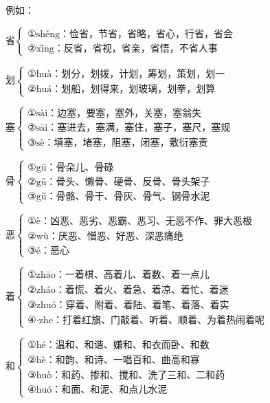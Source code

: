 例如：
\begin{flushleft}
$
\text{省}
\begin{cases}
	\text{①shěng：俭省，节省，省略，省心，行省，省会}\\
	\text{②xǐng：反省，省视，省亲，省悟，不省人事}
\end{cases}
$

\vspace{1em}

$
\text{划}
\begin{cases}
	\text{①huà：划分，划拨，计划，筹划，策划，划一}\\
	\text{②huá：划船，划得来，划玻璃，划拳，划算}
\end{cases}
$

\vspace{1em}

$
\text{塞}
\begin{cases}
	\text{①sài：边塞，要塞，塞外，关塞，塞翁失}\\
	\text{②sāi：塞进去，塞满，塞住，塞子，塞尺，塞规}\\
	\text{③sè：填塞，堵塞，阻塞，闭塞，敷衍塞责}
\end{cases}
$
\end{flushleft}

\begin{flushleft}
$
\text{骨}
\begin{cases}
	\text{①gū：骨朵儿、骨碌}\\
	\text{②gǔ：骨头、懒骨、硬骨、反骨、骨头架子}\\
	\text{③gǔ：骨骼、骨干、骨灰、骨气、钢骨水泥}
\end{cases}
$

\vspace{1em}

$
\text{恶}
\begin{cases}
	\text{①è：凶恶、恶劣、恶霸、恶习、无恶不作、罪大恶极}\\
	\text{②wù：厌恶、憎恶、好恶、深恶痛绝}\\
	\text{③ě：恶心}
\end{cases}
$

\vspace{1em}

$
\text{着}
\begin{cases}
	\text{①zhāo：一着棋、高着儿、着数、着一点儿}\\
	\text{②zháo：着慌、着火、着急、着凉、着忙、着迷}\\
	\text{③zhuó：穿着、附着、着陆、着笔、着落、着实}\\
	\text{④·zhe：打着红旗、门敲着、听着、顺着、为着热闹着呢}
\end{cases}
$

\vspace{1em}

$
\text{和}
\begin{cases}
	\text{①hé：温和、和谐、嫌和、和衣而卧、和数}\\
	\text{②hè：和韵、和诗、一唱百和、曲高和寡}\\
	\text{③huò：和药、掺和、搅和、洗了三和、二和药}\\
	\text{④huó：和面、和泥、和点儿水泥}
\end{cases}
$
\end{flushleft}

